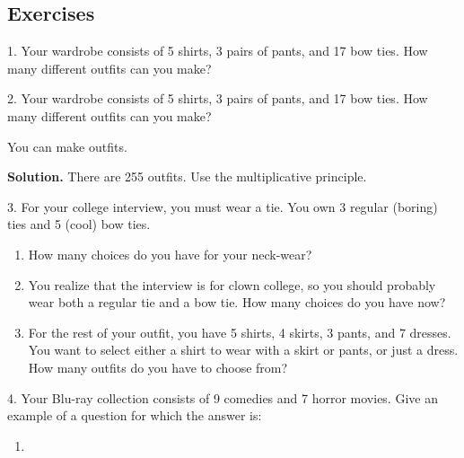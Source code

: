 \documentclass[12pt,]{book}
\theoremstyle{plain}
\theoremstyle{definition}
\theoremstyle{definition}
\theoremstyle{definition}
\numberwithin{equation}{chapter}
\begin{document}
\subsection*{Exercises}\label{exercises_counting-addmult}
\begin{exerciselist}
\item[1.]\hypertarget{exercise-88}{}\hypertarget{p-775}{}%
Your wardrobe consists of 5 shirts, 3 pairs of pants, and 17 bow ties. How many different outfits can you make?%
\par\smallskip
\item[2.]\hypertarget{exercise-89}{}\noindent%
\hypertarget{p-777}{}%
Your wardrobe consists of 5 shirts, 3 pairs of pants, and 17 bow ties. How many different outfits can you make?%
\par
\hypertarget{p-778}{}%
You can make  \framebox[5em]{\raisebox{1ex}{}} outfits.%
\par
\medskip\noindent%
\textbf{Solution.}\quad \hypertarget{p-779}{}%
There are 255 outfits. Use the multiplicative principle.%
\par
\item[3.]\hypertarget{exercise-90}{}\hypertarget{p-780}{}%
For your college interview, you must wear a tie. You own 3 regular (boring) ties and 5 (cool) bow ties. \leavevmode%
\begin{enumerate}[label=(\alph*)]
\item\hypertarget{li-347}{}How many choices do you have for your neck-wear?%
\item\hypertarget{li-348}{}\hypertarget{p-781}{}%
You realize that the interview is for clown college, so you should probably wear both a regular tie and a bow tie. How many choices do you have now?%
\item\hypertarget{li-349}{}\hypertarget{p-782}{}%
For the rest of your outfit, you have 5 shirts, 4 skirts, 3 pants, and 7 dresses. You want to select either a shirt to wear with a skirt or pants, or just a dress. How many outfits do you have to choose from?%
\end{enumerate}
%
\par\smallskip
\item[4.]\hypertarget{exercise-91}{}\hypertarget{p-785}{}%
Your Blu-ray collection consists of 9 comedies and 7 horror movies. Give an example of a question for which the answer is: \leavevmode%
\begin{enumerate}[label=(\alph*)]
\item\hypertarget{li-353}{}\hypertarget{p-786}{}%

\end{enumerate}
\end{exerciselist}
\end{document}
